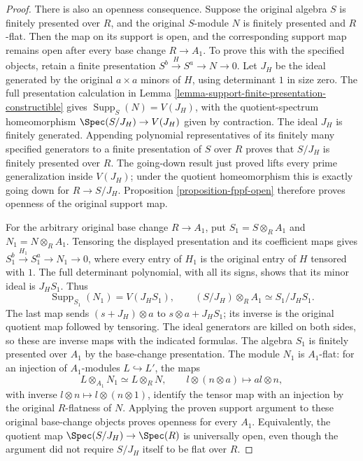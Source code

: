 \begin{proof}
\medskip\noindent
There is also an openness consequence. Suppose the
original algebra $S$ is finitely presented over $R$,
and the original $S$-module $N$ is finitely presented
and $R$-flat. Then the map on its support is open,
and the corresponding support map remains open
after every base change $R\to A_1$.
To prove this with the specified objects, retain
a finite presentation $S^b\xrightarrow{H}S^a\to N\to0$.
Let $J_H$ be the ideal generated by the original
$a\times a$ minors of $H$, using determinant $1$
in size zero. The full presentation calculation in
Lemma \ref{lemma-support-finite-presentation-constructible}
gives $\operatorname{Supp}_S(N)=V(J_H)$, with the
quotient-spectrum homeomorphism
$\Spec(S/J_H)\to V(J_H)$ given by contraction.
The ideal $J_H$ is finitely generated. Appending
polynomial representatives of its finitely many
specified generators to a finite presentation of
$S$ over $R$ proves that $S/J_H$ is finitely
presented over $R$. The going-down result just
proved lifts every prime generalization inside
$V(J_H)$; under the quotient homeomorphism this
is exactly going down for $R\to S/J_H$.
Proposition \ref{proposition-fppf-open} therefore
proves openness of the original support map.

For the arbitrary original base change $R\to A_1$,
put $S_1=S\otimes_RA_1$ and $N_1=N\otimes_RA_1$.
Tensoring the displayed presentation and its
coefficient maps gives
$S_1^b\xrightarrow{H_1}S_1^a\to N_1\to0$,
where every entry of $H_1$ is the original entry
of $H$ tensored with $1$. The full determinant
polynomial, with all its signs, shows that its
minor ideal is $J_HS_1$. Thus
$$
\operatorname{Supp}_{S_1}(N_1)=V(J_HS_1),
\qquad
(S/J_H)\otimes_RA_1\simeq S_1/J_HS_1.
$$
The last map sends $(s+J_H)\otimes a$ to
$s\otimes a+J_HS_1$; its inverse is the
original quotient map followed by tensoring.
The ideal generators are killed on both sides,
so these are inverse maps with the indicated
formulas. The algebra $S_1$ is finitely presented
over $A_1$ by the base-change presentation.
The module $N_1$ is $A_1$-flat: for an injection
of $A_1$-modules $L\hookrightarrow L'$, the maps
$$
L\otimes_{A_1}N_1\simeq L\otimes_RN,
\qquad l\otimes(n\otimes a)\longmapsto al\otimes n,
$$
with inverse $l\otimes n\mapsto l\otimes(n\otimes1)$,
identify the tensor map with an injection by
the original $R$-flatness of $N$.
Applying the proven support argument to these
original base-change objects proves openness
for every $A_1$. Equivalently, the quotient map
$\Spec(S/J_H)\to\Spec(R)$ is universally open,
even though the argument did not require
$S/J_H$ itself to be flat over $R$.


\end{proof}
